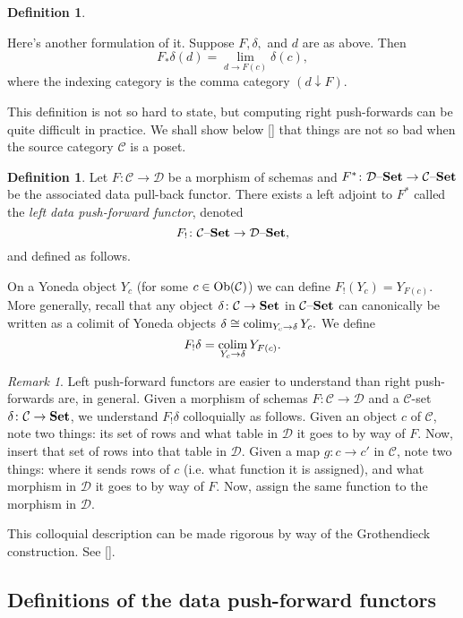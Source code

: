 \documentclass{amsart}
\def\tn{\textnormal}
\def\mc{\mathcal}
\def\Ob{\tn{Ob}}
\def\to{\rightarrow}
\def\taking{\colon}
\def\iso{\cong}
\def\down{\downarrow}
\def\Set{{\bf Set}}
\def\set{{\text \textendash}{\bf Set}}
\def\colim{\mathop{\tn{colim}}}
\def\mcC{\mc{C}}
\def\mcD{\mc{D}}
\theoremstyle{remark}
\newtheorem{remark}[theorem]{Remark}
\theoremstyle{definition}
\newtheorem{definition}[theorem]{Definition}
\begin{document}
{\begin{definition}
\end{definition}

Here's another formulation of it.  Suppose $F,\delta,$ and $d$ are as above.  Then $$F_*\delta(d)=\lim_{d\to F(c)}\delta(c),$$ where the indexing category is the comma category $(d\down F)$.

This definition is not so hard to state, but computing right push-forwards can be quite difficult in practice.  We shall show below \ref{} that things are not so bad when the source category $\mcC$ is a poset.

\begin{definition}

Let $F\taking\mcC\to\mcD$ be a morphism of schemas and $F^*\taking\mcD\set\to\mcC\set$ be the associated data pull-back functor.  There exists a left adjoint to $F^*$ called the {\em left data push-forward functor}, denoted $$F_!\taking\mcC\set\to\mcD\set,$$ and defined as follows.

On a Yoneda object $Y_c$ (for some $c\in\Ob(\mcC)$) we can define $F_!(Y_c)=Y_{F(c)}$.  More generally,  recall that any object $\delta\taking\mcC\to\Set$ in $\mcC\set$ can canonically be written as a colimit of Yoneda objects $\delta\iso\colim_{Y_c\to\delta}Y_c.$   We define $$F_!\delta=\colim_{Y_c\to\delta}Y_{F(c)}.$$  

\end{definition}

\begin{remark}

Left push-forward functors are easier to understand than right push-forwards are, in general.  Given a morphism of schemas $F\taking\mcC\to\mcD$ and a $\mcC$-set $\delta\taking\mcC\to\Set$, we understand $F_!\delta$ colloquially as follows.  Given an object $c$ of $\mcC$, note two things: its set of rows and what table in $\mcD$ it goes to by way of $F$.  Now, insert that set of rows into that table in $\mcD$.  Given a map $g\taking c\to c'$ in $\mcC$, note two things: where it sends rows of $c$ (i.e. what function it is assigned), and what morphism in $\mcD$ it goes to by way of $F$.  Now, assign the same function to the morphism in $\mcD$.

This colloquial description can be made rigorous by way of the Grothendieck construction.  See \ref{}.

\end{remark}
}%

\subsection{Definitions of the data push-forward functors}\label{sec:def data mig}
\end{document}
